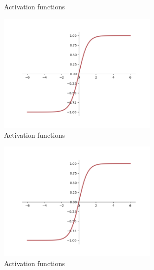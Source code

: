 \begin{figure}[h]
	\begin{center}
   \def\svgwidth{\textwidth}
	\end{center}
    \caption{Activation functions}
    \label{fig:activationfunctions}
\end{figure}
\iffalse
\begin{figure}[h]
	\begin{center}
        \includegraphics[width=0.7\textwidth]{figures/png/tanhnew.png}%
	\end{center}
    \caption{Activation functions}
    \label{fig:activationfunctions1}
\end{figure}
\begin{figure}[h]
	\begin{center}
        \includegraphics[width=0.7\textwidth]{figures/png/tanhnew.png}%
	\end{center}
    \caption{Activation functions}
    \label{fig:activationfunctions2}
\end{figure}
